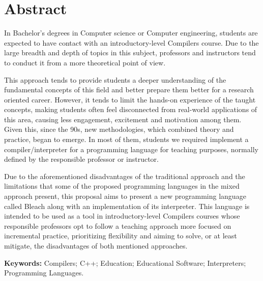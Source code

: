 \chapter*{Abstract}
\begin{spacing}{1.0}
In Bachelor's degrees in Computer science or Computer engineering, students are expected to have contact with an introductory-level Compilers course. Due to the large breadth and depth of topics in this subject, professors and instructors tend to conduct it from a more theoretical point of view. 

This approach tends to provide students a deeper understanding of the fundamental concepts of this field and better prepare them better for a research oriented career. However, it tends to limit the hands-on experience of the taught concepts, making students often feel disconnected from real-world applications of this area, causing less engagement, excitement and motivation among them. Given this, since the 90s, new methodologies, which combined theory and practice, began to emerge. In most of them, students we required implement a compiler/interpreter for a programming language for teaching purposes, normally defined by the responsible professor or instructor.

Due to the aforementioned disadvantages of the traditional approach and the limitations that some of the proposed programming languages in the mixed approach present, this proposal aims to present a new programming language called Bleach along with an implementation of its interpreter. This language is intended to be used as a tool in introductory-level Compilers courses whose responsible professors opt to follow a teaching approach more focused on incremental practice, prioritizing flexibility and aiming to solve, or at least mitigate, the disadvantages of both mentioned approaches.



\textbf{Keywords:} Compilers; C++; Education; Educational Software; Interpreters; Programming Languages.  

\end{spacing}